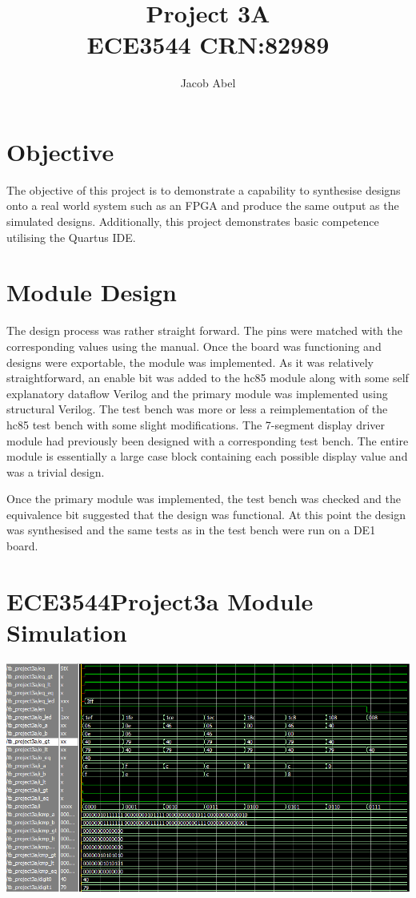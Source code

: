 \documentclass[12pt,letterpaper,titlepage]{article}
\author{Jacob Abel}
\title{	Project 3A
	\\\large ECE3544 CRN:82989
}
\begin{document}



\maketitle
\begin{raggedright}

\section*{Objective}
The objective of this project is to demonstrate a capability to synthesise designs onto a real world system such as an FPGA and produce the same output as the simulated designs. Additionally, this project demonstrates basic competence utilising the Quartus IDE.

\section{Module Design}
The design process was rather straight forward. The pins were matched with the corresponding values using the manual. Once the board was functioning and designs were exportable, the module was implemented. As it was relatively straightforward, an enable bit was added to the hc85 module along with some self explanatory dataflow Verilog and the primary module was implemented using structural Verilog. The test bench was more or less a reimplementation of the hc85 test bench with some slight modifications. The 7-segment display driver module had previously been designed with a corresponding test bench. The entire module is essentially a large case block containing each possible display value and was a trivial design.

Once the primary module was implemented, the test bench was checked and the equivalence bit suggested that the design was functional. At this point the design was synthesised and the same tests as in the test bench were run on a DE1 board.

\clearpage
\section{ECE3544Project3a Module Simulation}
\begin{center}
\includegraphics[width=\textwidth]{tb_p3a}


\end{center}
\end{raggedright}
\end{document}
